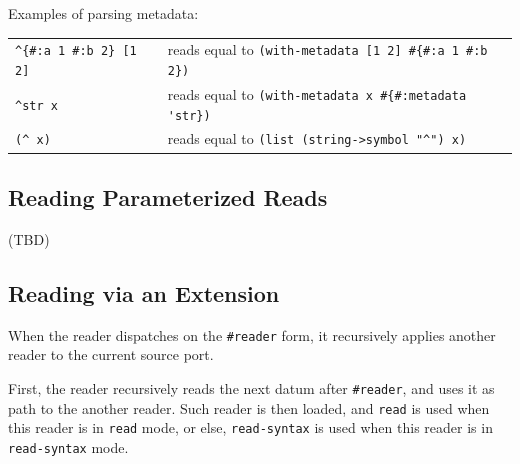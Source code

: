 \example Examples of parsing metadata:

\begin{tabular}{ l l }
  \lstinline!^{#:a 1 #:b 2} [1 2]! & reads equal to \lstinline!(with-metadata [1 2] #{#:a 1 #:b 2})! \\
  \lstinline!^str x! & reads equal to \lstinline!(with-metadata x #{#:metadata 'str})! \\
  \lstinline!(^ x)! & reads equal to \lstinline!(list (string->symbol "^") x)! \\
\end{tabular}






\subsection{Reading Parameterized Reads}
\label{subsec:aml-base-lang-reader-parameterized-reads}


(TBD)





\subsection{Reading via an Extension}
\label{subsec:aml-base-lang-reader-extension}

When the reader dispatches on the \lstinline!#reader! form, it recursively applies another reader to the current source port. 


First, the reader recursively reads the next datum after \lstinline!#reader!, and uses it as path to the another reader. Such reader is then loaded, and \lstinline!read! is used when this reader is in \lstinline!read! mode, or else, \lstinline!read-syntax! is used when this reader is in \lstinline!read-syntax! mode.

